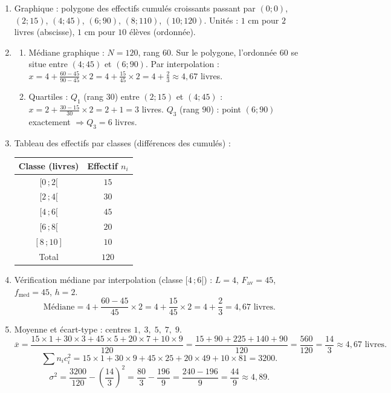 \documentclass[11pt]{article}
\begin{document}
\begin{corrige}
\begin{enumerate}
\item Graphique : polygone des effectifs cumulés croissants passant par $(0;0)$, $(2;15)$, $(4;45)$, $(6;90)$, $(8;110)$, $(10;120)$. Unités : $1$ cm pour $2$ livres (abscisse), $1$ cm pour $10$ élèves (ordonnée).
\item \begin{enumerate}
\item Médiane graphique : $N=120$, rang $60$. Sur le polygone, l'ordonnée $60$ se situe entre $(4;45)$ et $(6;90)$. Par interpolation : $x = 4 + \frac{60-45}{90-45}\times2 = 4 + \frac{15}{45}\times2 = 4 + \frac{2}{3} \approx 4,67$ livres.
\item Quartiles : $Q_1$ (rang $30$) entre $(2;15)$ et $(4;45)$ : $x = 2 + \frac{30-15}{30}\times2 = 2+1 = 3$ livres. $Q_3$ (rang $90$) : point $(6;90)$ exactement $\Rightarrow Q_3 = 6$ livres.
\end{enumerate}
\item Tableau des effectifs par classes (différences des cumulés) :
\begin{center}
\begin{tabular}{|c|c|}
\hline
\rowcolor{popblueL} Classe (livres) & Effectif $n_i$ \\
\hline
$[0\,;2[$ & $15$ \\
$[2\,;4[$ & $30$ \\
$[4\,;6[$ & $45$ \\
$[6\,;8[$ & $20$ \\
$[8\,;10]$ & $10$ \\
\hline
Total & $120$ \\
\hline
\end{tabular}
\end{center}
\item Vérification médiane par interpolation (classe $[4\,;6[$) :
$L=4$, $F_{\text{av}}=45$, $f_{\text{med}}=45$, $h=2$.
\[
\text{Médiane} = 4 + \frac{60-45}{45}\times2 = 4 + \frac{15}{45}\times2 = 4 + \frac{2}{3} = 4,67 \text{ livres}.
\]
\item Moyenne et écart-type : centres $1,\;3,\;5,\;7,\;9$.
\[
\overline{x} = \frac{15\times1 + 30\times3 + 45\times5 + 20\times7 + 10\times9}{120}
= \frac{15+90+225+140+90}{120} = \frac{560}{120} = \frac{14}{3} \approx 4,67 \text{ livres}.
\]
\[
\sum n_i c_i^2 = 15\times1 + 30\times9 + 45\times25 + 20\times49 + 10\times81 = 3200.
\]
\[
\sigma^2 = \frac{3200}{120} - \left(\frac{14}{3}\right)^2 = \frac{80}{3} - \frac{196}{9} = \frac{240-196}{9} = \frac{44}{9} \approx 4,89.
\]
\end{enumerate}
\end{corrige}
\end{document}
